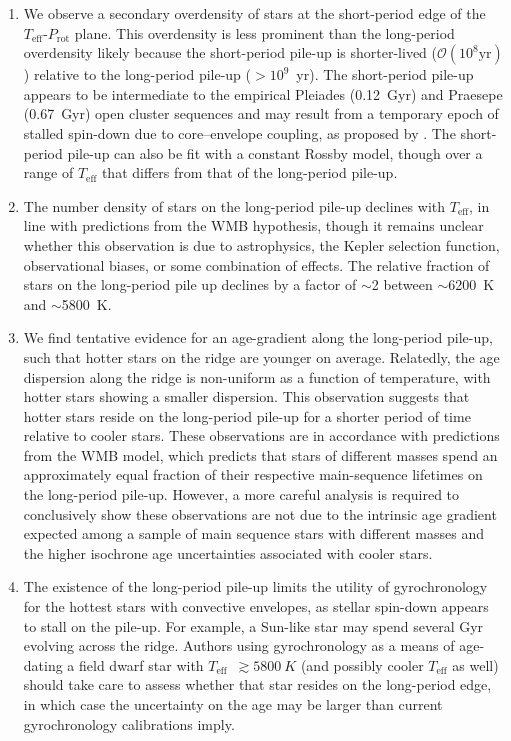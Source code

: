 \documentclass[linenumbers,tighten,trackchanges,twocolumn]{aastex631}
\newcommand{\teff}{\ensuremath{T_{\mathrm{eff}}}\xspace}
\newcommand{\prot}{\ensuremath{P_\mathrm{rot}}\xspace}
\begin{document}
\begin{enumerate}
    \item We observe a secondary overdensity of stars at the short-period edge of the \teff-\prot plane. This overdensity is less prominent than the long-period overdensity likely because the short-period pile-up is shorter-lived ($\mathcal{O}(10^8 \text{yr})$) relative to the long-period pile-up ($>10^9$~yr). The short-period pile-up appears to be intermediate to the empirical Pleiades (0.12~Gyr) and Praesepe (0.67~Gyr) open cluster sequences and may result from a temporary epoch of stalled spin-down due to core–envelope coupling, as proposed by \citet{Curtis2020}. The short-period pile-up can also be fit with a constant Rossby model, though over a range of \teff that differs from that of the long-period pile-up.
    
    \item The number density of stars on the long-period pile-up declines with \teff, in line with predictions from the WMB hypothesis, though it remains unclear whether this observation is due to astrophysics, the Kepler selection function, observational biases, or some combination of effects. The relative fraction of stars on the long-period pile up declines by a factor of $\sim$2 between $\sim$6200~K and $\sim$5800~K. 
    
    \item We find tentative evidence for an age-gradient along the long-period pile-up, such that hotter stars on the ridge are younger on average. Relatedly, the age dispersion along the ridge is non-uniform as a function of temperature, with hotter stars showing a smaller dispersion. This observation suggests that hotter stars reside on the long-period pile-up for a shorter period of time relative to cooler stars. These observations are in accordance with predictions from the WMB model, which predicts that stars of different masses spend an approximately equal fraction of their respective main-sequence lifetimes on the long-period pile-up. However, a more careful analysis is required to conclusively show these observations are not due to the intrinsic age gradient expected among a sample of main sequence stars with different masses and the higher isochrone age uncertainties associated with cooler stars.
    
    \item The existence of the long-period pile-up limits the utility of gyrochronology for the hottest stars with convective envelopes, as stellar spin-down appears to stall on the pile-up. For example, a Sun-like star may spend several Gyr evolving across the ridge. Authors using gyrochronology as a means of age-dating a field dwarf star with \teff~$\gtrsim 5800~K$ (and possibly cooler \teff as well) should take care to assess whether that star resides on the long-period edge, in which case the uncertainty on the age may be larger than current gyrochronology calibrations imply.
    

\end{enumerate}
\end{document}
